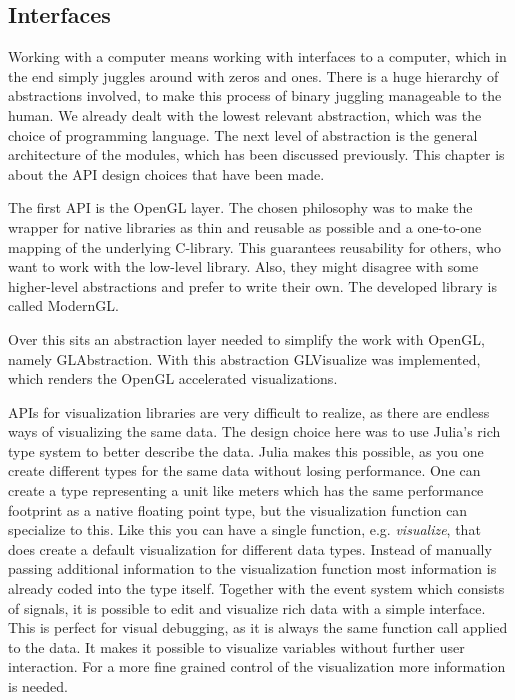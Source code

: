 \subsection{Interfaces}

Working with a computer means working with interfaces to a computer, which in the end simply juggles around with zeros and ones. There is a huge hierarchy of abstractions involved, to make this process of binary juggling manageable to the human.
We already dealt with the lowest relevant abstraction, which was the choice of programming language.
The next level of abstraction is the general architecture of the modules, which has been discussed previously. 
This chapter is about the API design choices that have been made.

The first \ac{API} is the \ac{OpenGL} layer. 
The chosen philosophy was to make the wrapper for native libraries as thin and reusable as possible and a one-to-one mapping of the underlying C-library.
This guarantees reusability for others, who want to work with the low-level library. Also, they might disagree with some higher-level abstractions and prefer to write their own.
The developed library is called ModernGL\cite{ModernGL}.

Over this sits an abstraction layer needed to simplify the work with \ac{OpenGL}, namely GLAbstraction\cite{GLAbstraction}.
With this abstraction GLVisualize\cite{GLVisualize} was implemented, which renders the \ac{OpenGL} accelerated visualizations.

\ac{API}s for visualization libraries are very difficult to realize, as there are endless ways of visualizing the same data.
The design choice here was to use Julia's rich type system to better describe the data. 
Julia makes this possible, as you one create different types for the same data without losing performance.
One can create a type representing a unit like meters which has the same performance footprint as a native floating point type, but the visualization function can specialize to this.
Like this you can have a single function, e.g. \textit{visualize}, that does create a default visualization for different data types. 
Instead of manually passing additional information to the visualization function most information is already coded into the type itself.
Together with the event system which consists of signals, it is possible to edit and visualize rich data with a simple interface. This is perfect for visual debugging, as it is always the same function call applied to the data. 
It makes it possible to visualize variables without further user interaction.
For a more fine grained control of the visualization more information is needed.

